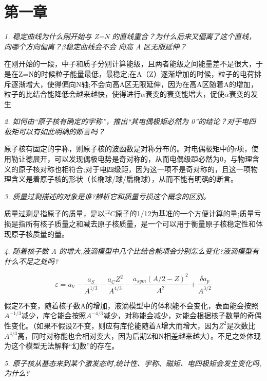 \documentclass{article}
\begin{document}
\fancyfoot[C]{\thepage}

\section*{第一章}

\emph{1. 稳定曲线为什么刚开始与 Z=N 的直线重合？为什么后来又偏离了这个直线，向哪个方向偏离？$\beta$稳定曲线会不会
向高 A 区无限延伸？}

在刚开始的一段，中子和质子分别计算能级，且两者能级之间能量差不是很大，于是在Z=N的时候粒子能量最低，最稳定;在A（Z）逐渐增加的时候，粒子的电荷排斥逐渐增大，使得偏向N轴;不会向高A区无限延伸，因为在高A区随着A的增加，粒子的比结合能降低会越来越快，使得进行$\alpha$衰变的衰变能增大，促使$\alpha$衰变的发生

\emph{}

\emph{2. 如何由“原子核有确定的宇称”，推出“其电偶极矩必然为 0”的结论？对于电四极矩可以有如此明确的断言吗？}

原子核有固定的宇称，则原子核的波函数是对称分布的。对电偶极矩中的r项，使用勒让德展开，可以发现偶极电势是奇对称的，从而电偶级距必然为0，与物理含义的原子核对称也相符合;对于电四级距，因为这一项不是奇对称的，且这一项物理含义是着原子核的形状（长椭球/球/扁椭球），从而不能有明确的断言。

\emph{}

\emph{3. 质量过剩描述的对象是谁?辨析它和质量亏损这个概念的区别。}

质量过剩是指原子的质量，是以$^{12}C$原子的1/12为基准的一个方便计算的量;质量亏损是指所有核子质量之和减去原子核质量，是一个可以用于衡量原子核稳定性和体现原子核质量的量。

\emph{}

\emph{4. 随着核子数 A 的增大,液滴模型中几个比结合能项会分别怎么变化?液滴模型有什么不足之处吗?}

$$\varepsilon=a_V-\frac{a_S}{A^{1/3}}-\frac{a_C Z^2}{A^{4/3}}-\frac{a_{sym}(A/2-Z)^2}{A^2}+\frac{\delta a_p}{A^{3/2}}$$

假定Z不变，随着核子数A的增加，液滴模型中的体积能不会变化，表面能会按照$A^{-1/3}$减少，库仑能会按照$A^{-4/3}$减少，对称能会减少，对能会根据核子数量的奇偶性变化。（如果不假设Z不变，则应有库伦能随着A增大而增大，因为$Z^2$是次数比$A^{4/3}$高，同时对称能也会相对变大，因为后期Z和N相差越来越大）。不足之处体现为这个模型无法解释“幻数”的存在。

\emph{}

\emph{5. 原子核从基态来到某个激发态时,统计性、宇称、磁矩、电四极矩会发生变化吗,为什么?}
\end{document}
